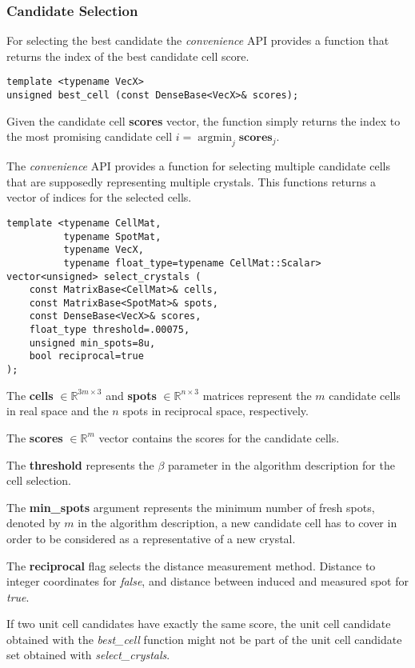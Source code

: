 \documentclass[a4paper,10pt]{article}
\DeclareMathOperator*{\argmin}{argmin}
\newcommand{\vect}[1]{\mathbf{#1}}
\begin{document}
\subsubsection{Candidate Selection}

For selecting the best candidate the \emph{convenience} API provides a function that returns the index of the best candidate cell score.
%
\begin{lstlisting}
template <typename VecX>
unsigned best_cell (const DenseBase<VecX>& scores);
\end{lstlisting}

Given the candidate cell \textbf{scores} vector, the function simply returns the index to the most promising candidate cell $i = \argmin_j \vect{scores}_j$.

The \emph{convenience} API provides a function for selecting multiple candidate cells that are supposedly representing multiple crystals. This functions returns a vector of indices for the selected cells.
%
\begin{lstlisting}
template <typename CellMat,
          typename SpotMat,
          typename VecX,
          typename float_type=typename CellMat::Scalar>
vector<unsigned> select_crystals (
    const MatrixBase<CellMat>& cells,
    const MatrixBase<SpotMat>& spots,
    const DenseBase<VecX>& scores,
    float_type threshold=.00075,
    unsigned min_spots=8u,
    bool reciprocal=true
);
\end{lstlisting}

The \textbf{cells} $\in \mathbb{R}^{3m\times 3}$ and \textbf{spots} $\in \mathbb{R}^{n\times 3}$ matrices represent the $m$ candidate cells in real space and the $n$ spots in reciprocal space, respectively.

The \textbf{scores} $\in \mathbb{R}^m$ vector contains the scores for the candidate cells.

The \textbf{threshold} represents the $\beta$ parameter in the algorithm description for the cell selection.

The \textbf{min\_spots} argument represents the minimum number of fresh spots, denoted by $m$ in the algorithm description, a new candidate cell has to cover in order to be considered as a representative of a new crystal.

The \textbf{reciprocal} flag selects the distance measurement method. Distance to integer coordinates for \emph{false}, and distance between induced and measured spot for \emph{true}.

If two unit cell candidates have exactly the same score, the unit cell candidate obtained with the \emph{best\_cell} function might not be part of the unit cell candidate set obtained with \emph{select\_crystals}.
\end{document}
